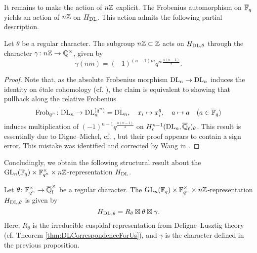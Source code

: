 \documentclass[../main.tex]{subfiles}
\begin{document}
It remains to make the action of $n\mathbb{Z}$ explicit. The Frobenius automorphism on
$\overline {\mathbb{F}}_q$ yields an action of $n\mathbb{Z}$ on $\hH_\DL$. This action admits the
following partial description.

\begin{prop}
  Let $\theta$ be a regular character. The subgroup $n\mathbb{Z} \subset \mathbb{Z}$ acts on
  $H_{\mathrm{DL},\theta}$ through the character $\gamma\colon 
  n\mathbb{Z} \to \mathbb{Q}^\times$, given by
  $$\gamma(nm) =  (-1)^{(n-1)m} q^{m \frac{n(n-1)}2}.$$
  \begin{proof}
    Note that, as the absolute Frobenius morphism $\mathrm{DL}_n \to \mathrm{DL}_n$
    induces the identity on \'etale cohomology (cf.
    \cite[\href{https://stacks.math.columbia.edu/tag/03SN}{Tag
    03SN}]{stacks-project}), the claim is equivalent to showing that pullback 
    along the relative Frobenius 
    \begin{equation*}
      \mathrm{Frob}_{q^n}\colon  \mathrm{DL}_n \to \mathrm{DL}_n^{(q^n)} = \mathrm{DL}_n, \quad
      x_i \mapsto x_i^q,\quad a \mapsto a \quad (a \in \overline {\mathbb{F}}_q)
    \end{equation*}
    induces multiplication of $(-1)^{n-1}q^{\frac{n(n-1)}2}$
    on $H^{n-1}_c(\mathrm{DL}_n, \overline {\mathbb{Q}}_\ell)_\theta$. 
    This result is essentially due to Digne--Michel, cf. \cite[Remarque
    3.14]{digne1985fonctions}, but their proof appears to contain a sign error.
    This mistake was identified and corrected by Wang in \cite[Théorème
    3.1.12]{wang2014espace}.
  \end{proof}
\end{prop}

Concludingly, we obtain the following structural result about the 
$\operatorname{GL}_n(\mathbb{F}_q) \times \mathbb{F}_{q^n}^\times \times n\mathbb{Z}$-representation 
$\hH_\DL$.

\begin{thm}[Structure of $\hH_\DL$]\label{thm:MainThmHDlStructure}
  Let $\theta\colon  \mathbb{F}_{q^n}^\times \to \overline {\mathbb{Q}}_l^\times$ be a regular character.  
  The $\operatorname{GL}_n(\mathbb{F}_q) \times \mathbb{F}_{q^n}^\times \times n\mathbb{Z}$-representation
  $H_{\mathrm{DL}, \theta}$ is given by 
  \begin{equation*}
    {H_\mathrm{DL}}_{,\theta} = R_\theta \boxtimes \theta \boxtimes \gamma.
  \end{equation*}
  Here, $R_\theta$ is the irreducible cuspidal representation from
  Deligne--Lusztig theory (cf. Theorem \ref{thm:DLCorrespondenceForUs}), and
  $\gamma$ is the character defined in the previous proposition.
\end{thm}

\end{document}

